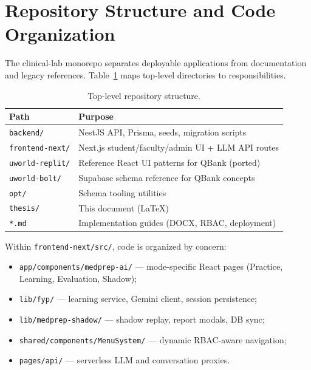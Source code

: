 
\section{Repository Structure and Code Organization}
The clinical-lab monorepo separates deployable applications from documentation and legacy references. Table~\ref{tab:repo-structure} maps top-level directories to responsibilities.

\begin{table}[htbp]
  \centering
  \caption{Top-level repository structure.}
  \label{tab:repo-structure}
  \small
  \begin{tabular}{@{}p{3.5cm}p{9.5cm}@{}}
    \toprule
    \textbf{Path} & \textbf{Purpose} \\
    \midrule
    \texttt{backend/} & NestJS API, Prisma, seeds, migration scripts \\
    \texttt{frontend-next/} & Next.js student/faculty/admin UI + LLM API routes \\
    \texttt{uworld-replit/} & Reference React UI patterns for QBank (ported) \\
    \texttt{uworld-bolt/} & Supabase schema reference for QBank concepts \\
    \texttt{opt/} & Schema tooling utilities \\
    \texttt{thesis/} & This document (LaTeX) \\
    \texttt{*.md} & Implementation guides (DOCX, RBAC, deployment) \\
    \bottomrule
  \end{tabular}
\end{table}

Within \texttt{frontend-next/src/}, code is organized by concern:
\begin{itemize}
  \item \texttt{app/components/medprep-ai/} --- mode-specific React pages (Practice, Learning, Evaluation, Shadow);
  \item \texttt{lib/fyp/} --- learning service, Gemini client, session persistence;
  \item \texttt{lib/medprep-shadow/} --- shadow replay, report modals, DB sync;
  \item \texttt{shared/components/MenuSystem/} --- dynamic RBAC-aware navigation;
  \item \texttt{pages/api/} --- serverless LLM and conversation proxies.
\end{itemize}

